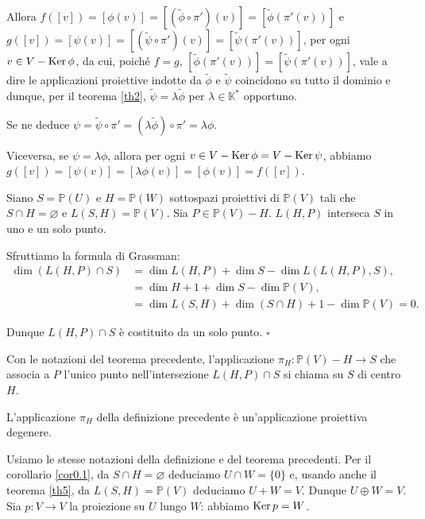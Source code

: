 	\par Allora $f([v]) = [\phi(v)] = [(\widetilde{\phi} \circ \pi')(v)] = [\widetilde{\phi}(\pi'(v))]$ e $g([v]) = [\psi(v)] = [(\widetilde{\psi} \circ \pi') (v)] = [\widetilde{\psi}(\pi'(v))]$, per ogni $v \in V - \operatorname{Ker} \phi$, da cui, poich\'e $f = g$, $[\widetilde{\phi}(\pi'(v))] = [\widetilde{\psi}(\pi'(v))]$, vale a dire le applicazioni proiettive indotte da $\widetilde{\phi}$ e $\widetilde{\psi}$ coincidono su tutto il dominio e dunque, per il teorema \ref{th2}, $\widetilde{\psi} = \lambda \widetilde{\phi}$ per $\lambda \in \mathbb{K}^*$ opportuno.
	\par Se ne deduce $\psi = \widetilde{\psi} \circ \pi' = (\lambda \widetilde{\phi}) \circ \pi' = \lambda \phi$.
	\par Viceversa, se $\psi = \lambda \phi$, allora per ogni $v \in V - \operatorname{Ker} \phi = V - \operatorname{Ker} \psi$, abbiamo $g([v]) = [\psi(v)] = [\lambda \phi(v)] = [\phi(v)] = f([v])$. \EndProof
\begin{Theorem}\label{th10}
	Siano $S = \mathbb{P}(U)$ e $H = \mathbb{P}(W)$ sottospazi proiettivi di $\mathbb{P}(V)$ tali che $S \cap H = \varnothing$ e $L(S, H) = \mathbb{P}(V)$. Sia $P \in \mathbb{P}(V) - H$. $L(H, P)$ interseca $S$ in uno e un solo punto.
\end{Theorem}
\Proof Sfruttiamo la formula di Grassman:
\begin{align*}
	\dim(L(H,P) \cap S) &= \dim L(H,P) + \dim S - \dim L(L(H,P),S),\\
	&= \dim H + 1 + \dim S - \dim \mathbb{P}(V),\\
	&= \dim L(S,H) + \dim(S \cap H) + 1 - \dim \mathbb{P}(V) = 0.
\end{align*}
	\par Dunque $L(H,P) \cap S$ \`e costituito da un solo punto. $\square$
\begin{Definition}\label{def12}
	Con le notazioni del teorema precedente, l'applicazione $\pi_H: \mathbb{P}(V) - H \rightarrow S$ che associa a $P$ l'unico punto nell'intersezione $L(H,P) \cap S$ si chiama  su $S$ di centro $H$.
\end{Definition}
\begin{Theorem}\label{th11}
	L'applicazione $\pi_H$ della definizione precedente \`e un'applicazione proiettiva degenere.
\end{Theorem}
\Proof Usiamo le stesse notazioni della definizione e del teorema precedenti. Per il corollario \ref{cor0.1}, da $S \cap H = \varnothing$ deduciamo $U \cap W = \lbrace 0 \rbrace$ e, usando anche il teorema \ref{th5}, da $L(S, H) = \mathbb{P}(V)$ deduciamo $U + W = V$. Dunque $U \oplus W = V$. Sia $p: V \rightarrow V$ la proiezione su $U$ lungo $W$: abbiamo $\operatorname{Ker} p = W$.
